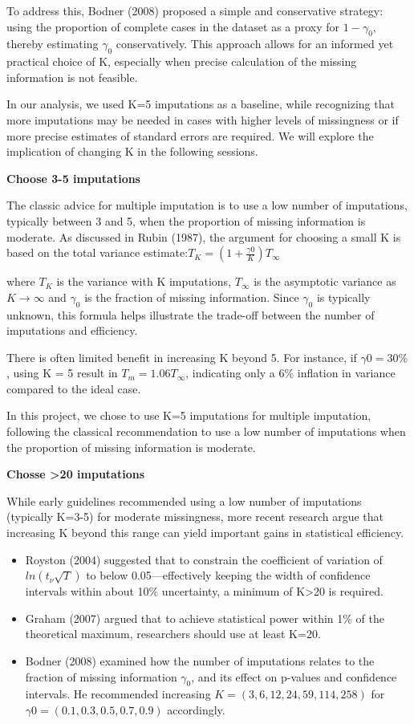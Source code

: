 \documentclass{article}
\providecommand{\tightlist}{%
  \setlength{\itemsep}{0pt}\setlength{\parskip}{0pt}}
\begin{document}
To address this, Bodner (2008) proposed a simple and conservative
strategy: using the proportion of complete cases in the dataset as a
proxy for \(1-\gamma_{0}\), thereby estimating \(\gamma_{0}\)
conservatively. This approach allows for an informed yet practical
choice of K, especially when precise calculation of the missing
information is not feasible.

In our analysis, we used K=5 imputations as a baseline, while
recognizing that more imputations may be needed in cases with higher
levels of missingness or if more precise estimates of standard errors
are required. We will explore the implication of changing K in the
following sessions.

\textbf{Choose 3-5 imputations}

The classic advice for multiple imputation is to use a low number of
imputations, typically between 3 and 5, when the proportion of missing
information is moderate. As discussed in Rubin (1987), the argument for
choosing a small K is based on the total variance
estimate:\(T_{K} = (1 + \frac{\gamma0}{K}) T_{\infty}\)

where \(T_{K}\) is the variance with K imputations, \(T_{\infty}\) is
the asymptotic variance as \(K \rightarrow \infty\) and \(\gamma_{0}\)
is the fraction of missing information. Since \(\gamma_{0}\) is
typically unknown, this formula helps illustrate the trade-off between
the number of imputations and efficiency.

There is often limited benefit in increasing K beyond 5. For instance,
if \(\gamma0=30\%\), using K = 5 result in \(T_m=1.06T_\infty\),
indicating only a 6\% inflation in variance compared to the ideal case.

In this project, we chose to use K=5 imputations for multiple
imputation, following the classical recommendation to use a low number
of imputations when the proportion of missing information is moderate.

\textbf{Chosse \textgreater20 imputations}

While early guidelines recommended using a low number of imputations
(typically K=3-5) for moderate missingness, more recent research argue
that increasing K beyond this range can yield important gains in
statistical efficiency.

\begin{itemize}
\tightlist
\item
  Royston (2004) suggested that to constrain the coefficient of
  variation of \(ln(t_{\nu}\sqrt{T})\) to below 0.05---effectively
  keeping the width of confidence intervals within about 10\%
  uncertainty, a minimum of K\textgreater20 is required.
\item
  Graham (2007) argued that to achieve statistical power within 1\% of
  the theoretical maximum, researchers should use at least K=20.
\item
  Bodner (2008) examined how the number of imputations relates to the
  fraction of missing information \(\gamma_{0}\), and its effect on
  p-values and confidence intervals. He recommended increasing
  \(K=(3,6,12,24,59,114,258)\) for \(\gamma0=(0.1, 0.3, 0.5, 0.7, 0.9)\)
  accordingly.
\end{itemize}
\end{document}
